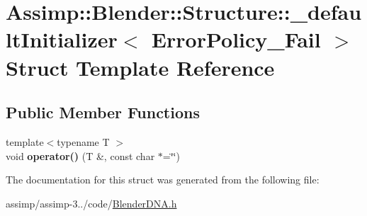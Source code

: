 \hypertarget{struct_assimp_1_1_blender_1_1_structure_1_1__default_initializer_3_01_error_policy___fail_01_4}{\section{Assimp\+:\+:Blender\+:\+:Structure\+:\+:\+\_\+default\+Initializer$<$ Error\+Policy\+\_\+\+Fail $>$ Struct Template Reference}
\label{struct_assimp_1_1_blender_1_1_structure_1_1__default_initializer_3_01_error_policy___fail_01_4}
}
\subsection*{Public Member Functions}
\begin{DoxyCompactItemize}
\item 
\hypertarget{struct_assimp_1_1_blender_1_1_structure_1_1__default_initializer_3_01_error_policy___fail_01_4_a8932980b20e04a1591dd952ae1ca1325}{{\footnotesize template$<$typename T $>$ }\\void {\bfseries operator()} (T \&, const char $\ast$=\char`\"{}\char`\"{})}\label{struct_assimp_1_1_blender_1_1_structure_1_1__default_initializer_3_01_error_policy___fail_01_4_a8932980b20e04a1591dd952ae1ca1325}

\end{DoxyCompactItemize}


The documentation for this struct was generated from the following file\+:\begin{DoxyCompactItemize}
\item 
assimp/assimp-\/3../code/\hyperlink{_blender_d_n_a_8h}{Blender\+D\+N\+A.\+h}\end{DoxyCompactItemize}
